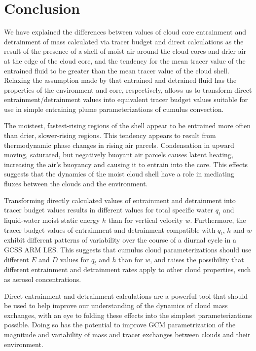 \documentclass[12pt]{article}
\begin{document}

\section{Conclusion}

We have explained the differences between values of cloud core 
entrainment and detrainment of mass calculated via tracer budget and 
direct calculations as the result of the presence of a shell of moist 
air around the cloud cores and drier air at the edge of the cloud core, 
and the tendency for the mean tracer value of the entrained fluid to be 
greater than the mean tracer value of the cloud shell.  Relaxing the 
assumption made by \cite{Siebesma1995} that entrained and detrained 
fluid has the properties of the environment and core, respectively, 
allows us to transform direct entrainment/detrainment values into 
equivalent tracer budget values suitable for use in simple entraining 
plume parameterizations of cumulus convection.  

The moistest, fastest-rising regions of the shell appear to be entrained 
more often than drier, slower-rising regions.  This tendency appears to 
result from thermodynamic phase changes in rising air parcels. 
Condensation in upward moving, saturated, but negatively buoyant air 
parcels causes latent heating, increasing the air's buoyancy and causing 
it to entrain into the core.  This effects suggests that the dynamics of 
the moist cloud shell have a role in mediating fluxes between the clouds 
and the environment.

Transforming directly calculated values of entrainment and detrainment 
into tracer budget values results in different values for total specific
water $q_t$ and liquid-water moist static energy $h$ than for vertical 
velocity $w$.  Furthermore, the tracer budget values of entrainment
and detrainment compatible with $q_t$, $h$ and $w$ exhibit different 
patterns of variability over the course of a diurnal cycle in a GCSS ARM 
LES.  This suggests that cumulus cloud parameterizations should use 
different $E$ and $D$ values for $q_t$ and $h$ than for $w$, and raises
the possibility that different entrainment and detrainment rates apply to
other cloud properties, such as aerosol concentrations.

Direct entrainment and detrainment calculations are a powerful tool 
that should be used to help improve our understanding of the dynamics of 
cloud mass exchanges, with an eye to folding these effects into the 
simplest parameterizations possible. Doing so has the potential to 
improve GCM parametrization of the magnitude and variability of mass and 
tracer exchanges between clouds and their environment.
\end{document}
